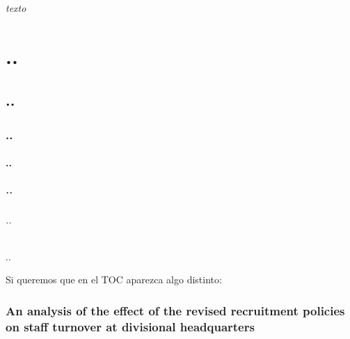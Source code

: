\documentclass{article}
\begin{document}
\maketitle

\tableofcontents %

\emph{texto} %

\part{..} %
\chapter{..}
\section{..}
\subsection{..}
\subsubsection{..}
\paragraph{..}
\subparagraph{..}

Si queremos que en el TOC aparezca algo distinto:
\section[Effect on staff turnover]{An analysis of the effect of the revised recruitment policies on staff turnover at divisional headquarters}



\end{document}
